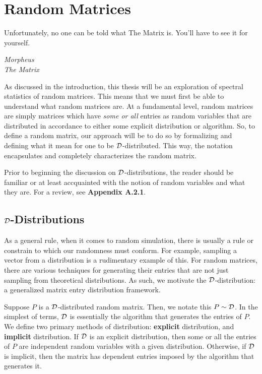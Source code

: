 
\chapter{Random Matrices}

\epigraph{Unfortunately, no one can be told what The Matrix is. You'll have to see it for yourself.}{\textit{Morpheus \\ The Matrix}}

As discussed in the introduction, this thesis will be an exploration of spectral statistics of random matrices. This means that we must first be able to understand what random matrices are.
At a fundamental level, random matrices are simply matrices which have \textit{some or all} entries as random variables that are distributed in accordance to either some explicit distribution or algorithm.
So, to define a random matrix, our approach will be to do so by formalizing and defining what it mean for one to be $\D$-distributed.
This way, the notation encapsulates and completely characterizes the random matrix.

Prior to beginning the discussion on $\D$-distributions, the reader should be familiar or at least accquainted with the notion of random variables and what they are.
For a review, see \textbf{Appendix A.2.1}.


\section{$\D$-Distributions}

As a general rule, when it comes to random simulation, there is usually a rule or constrain to which our randomness must conform.
For example, sampling a vector from a distribution is a rudimentary example of this.
For random matrices, there are various techniques for generating their entries that are not just sampling from theoretical distributions.
As such, we motivate the $\D$-distribution: a generalized matrix entry distribution framework.

\begin{definition}[$\D$-distribution]
Suppose $P$ is a $\D$-distributed random matrix. Then, we notate this $P \sim \mathcal{D}$. In the simplest of terms, $\D$ is essentially the algorithm that generates the entries of $P$.
We define two primary methods of distribution: \textbf{explicit} distribution, and \textbf{implicit} distribution.
If $\D$ is an explicit distribution, then some or all the entries of $P$ are independent random variables with a given distribution.
Otherwise, if $\D$ is implicit, then the matrix has dependent entries imposed by the algorithm that generates it.
\end{definition}

